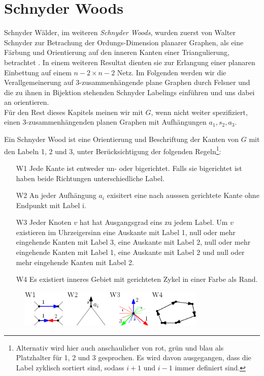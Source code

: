 \section{Schnyder Woods}\label{sw}
Schnyder Wälder, im weiteren \textit{Schnyder Woods}, wurden zuerst von Walter Schnyder zur Betrachung der Ordungs-Dimension planarer Graphen, als eine Färbung und Orientierung auf den inneren Kanten einer Triangulierung, betrachtet \cite{schnyder89}. In einem weiteren Resultat dienten sie zur Erlangung einer planaren Einbettung auf einem $n-2 \times n-2$ Netz\cite{schnyder90}. Im Folgenden werden wir die Verallgemeinerung auf 3-zusammenhängende plane Graphen durch Felsner \cite{felsner01} und die zu ihnen in Bijektion stehenden Schnyder Labelings einführen und uns dabei an \cite{felsner04} orientieren.\\

Für den Rest dieses Kapitels meinen wir mit $G$, wenn nicht weiter spezifiziert, einen 3-zusammenhängenden planen Graphen mit Aufhängungen $a_1,s_2,a_3$.

\begin{definition}
Ein Schnyder Wood ist eine Orientierung und Beschriftung der Kanten von $G$ mit den Labeln 1, 2 und 3, unter Berücksichtigung der folgenden Regeln\footnote{Alternativ wird hier auch anschaulicher von rot, grün und blau als Platzhalter für 1, 2 und 3 gesprochen. Es wird davon ausgegangen, dass die Label zyklisch sortiert sind, sodass $i+1$ und $i-1$ immer definiert sind.}:
\begin{itemize}
\item[W1] Jede Kante ist entweder un- oder bigerichtet. Falls sie bigerichtet ist haben beide Richtungen unterschiedliche Label.
\item[W2] An jeder Aufhängung  $a_i$ exisitert eine nach ausssen gerichtete Kante ohne Endpunkt mit Label i.  
\item[W3] Jeder Knoten $v$ hat hat Ausgangsgrad eins zu jedem Label. Um $v$ existieren im Uhrzeigersinn eine Auskante mit Label 1, null oder mehr eingehende Kanten mit Label 3, eine Auskante mit Label 2, null oder mehr  eingehende Kanten mit Label 1, eine Auskante mit Label 2 und null oder mehr  eingehende Kanten mit Label 2.
\item[W4] Es existiert inneres Gebiet mit gerichteten Zykel in einer Farbe als Rand.
\end{itemize}
\end{definition}

\begin{figure}[h]
	\centering
  \includegraphics[width=0.8\textwidth]{schnyder_wood_def.png}
	\label{10_example}
\end{figure}

